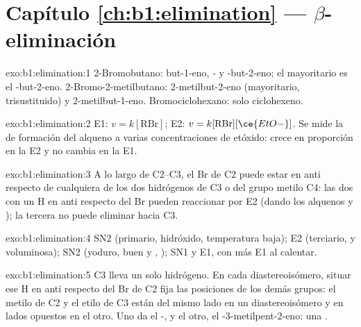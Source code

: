 \section*{Capítulo \ref{ch:b1:elimination} --- \texorpdfstring{$\beta$}{Beta}-eliminación}

\begin{solution}{exo:b1:elimination:1}
2-Bromobutano: but-1-eno, - y -but-2-eno; el mayoritario es el
-but-2-eno. 2-Bromo-2-metilbutano: 2-metilbut-2-eno (mayoritario,
trisustituido) y 2-metilbut-1-eno. Bromociclohexano: solo ciclohexeno.
\end{solution}

\begin{solution}{exo:b1:elimination:2}
E1: $v = k[\mathrm{RBr}]$; E2: $v = k[\mathrm{RBr}][\ce{EtO-}]$. Se mide la
 de formación del alqueno a varias concentraciones de
etóxido: crece en proporción en la E2 y no cambia en la E1.
\end{solution}

\begin{solution}{exo:b1:elimination:3}
A lo largo de C2--C3, el Br de C2 puede estar en anti respecto de
cualquiera de los dos hidrógenos de C3 o del grupo metilo C4: las dos
 con un H en anti respecto del Br pueden reaccionar por E2
(dando los alquenos  y ); la tercera no puede eliminar
hacia C3.
\end{solution}

\begin{solution}{exo:b1:elimination:4}
SN2 (primario, hidróxido, temperatura baja); E2 (terciario,  y
voluminosa); SN2 (yoduro, buen  y , ); SN1 y E1, con más E1 al calentar.
\end{solution}

\begin{solution}{exo:b1:elimination:5}
C3 lleva un solo hidrógeno. En cada diastereoisómero, situar ese H en
anti respecto del Br de C2 fija las posiciones de los demás grupos: el
metilo de C2 y el etilo de C3 están del mismo lado en un diastereoisómero
y en lados opuestos en el otro. Uno da el -, y el otro, el
-3-metilpent-2-eno: una .
\end{solution}

